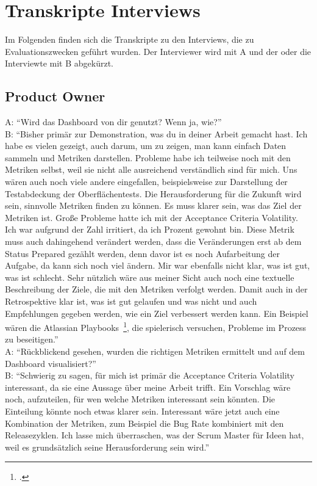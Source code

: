 \newpage
\section{Transkripte Interviews}\label{appendix:transcript}

Im Folgenden finden sich die Transkripte zu den Interviews, die zu Evaluationszwecken geführt wurden.
Der Interviewer wird mit A und der oder die Interviewte mit B abgekürzt.

\subsection{Product Owner}

A\@: ``Wird das Dashboard von dir genutzt? Wenn ja, wie?'' \\
B\@: ``Bisher primär zur Demonstration, was du in deiner Arbeit gemacht hast. Ich habe es vielen gezeigt, auch darum, um zu zeigen, man kann einfach Daten sammeln und Metriken darstellen. Probleme habe ich teilweise noch mit den Metriken selbst, weil sie nicht alle ausreichend verständlich sind für mich. Uns wären auch noch viele andere eingefallen, beispielsweise zur Darstellung der Testabdeckung der Oberflächentests. Die Herausforderung für die Zukunft wird sein, sinnvolle Metriken finden zu können. Es muss klarer sein, was das Ziel der Metriken ist. Große Probleme hatte ich mit der Acceptance Criteria Volatility. Ich war aufgrund der Zahl irritiert, da ich Prozent gewohnt bin. Diese Metrik muss auch dahingehend verändert werden, dass die Veränderungen erst ab dem Status Prepared gezählt werden, denn davor ist es noch Aufarbeitung der Aufgabe, da kann sich noch viel ändern. Mir war ebenfalls nicht klar, was ist gut, was ist schlecht. Sehr nützlich wäre aus meiner Sicht auch noch eine textuelle Beschreibung der Ziele, die mit den Metriken verfolgt werden. Damit auch in der Retrospektive klar ist, was ist gut gelaufen und was nicht und auch Empfehlungen gegeben werden, wie ein Ziel verbessert werden kann. Ein Beispiel wären die Atlassian Playbooks~\footcite{atlassian_playbook}, die spielerisch versuchen, Probleme im Prozess zu beseitigen.'' \\
A\@: ``Rückblickend gesehen, wurden die richtigen Metriken ermittelt und auf dem Dashboard visualisiert?'' \\
B\@: ``Schwierig zu sagen, für mich ist primär die Acceptance Criteria Volatility interessant, da sie eine Aussage über meine Arbeit trifft. Ein Vorschlag wäre noch, aufzuteilen, für wen welche Metriken interessant sein könnten. Die Einteilung könnte noch etwas klarer sein. Interessant wäre jetzt auch eine Kombination der Metriken, zum Beispiel die Bug Rate kombiniert mit den Releasezyklen. Ich lasse mich überraschen, was der Scrum Master für Ideen hat, weil es grundsätzlich seine Herausforderung sein wird.''

